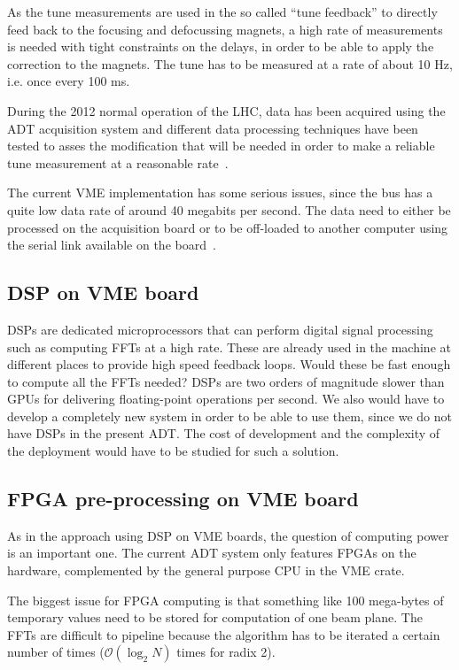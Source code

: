 As the tune measurements are used in the so called ``tune feedback'' to directly feed back to the focusing and defocussing magnets, a high rate of measurements is needed with tight constraints on the delays, in order to be able to apply the correction to the magnets. The \gls{tune} has to be measured at a rate of about 10 Hz, i.e. once every 100 ms.

During the 2012 normal operation of the \gls{LHC}, data has been acquired using the \gls{ADT} acquisition system and different data processing techniques have been tested to asses the modification that will be needed in order to make a reliable \gls{tune} measurement at a reasonable rate~\cite{HofleChamonix12}.

The current \gls{VME} implementation has some serious issues, since the bus has a quite low data rate of around 40 megabits per second. The data need to either be processed on the acquisition board or to be off-loaded to another computer using the serial link available on the board~\cite{Baudrenghien:1124094}.

\subsection{DSP on VME board}

\Glspl{DSP} are dedicated microprocessors that can perform digital signal processing such as computing \glspl{FFT} at a high rate. These are already used in the machine at different places to provide high speed feedback loops. Would these be fast enough to compute all the \glspl{FFT} needed? \glspl{DSP} are two orders of magnitude slower than \glspl{GPU} for delivering floating-point operations per second. We also would have to develop a completely new system in order to be able to use them, since we do not have \glspl{DSP} in the present \gls{ADT}. The cost of development and the complexity of the deployment would have to be studied for such a solution.

\subsection{FPGA pre-processing on VME board}

As in the approach using \gls{DSP} on VME boards, the question of computing power is an important one. The current \gls{ADT} system only features \glspl{FPGA} on the hardware, complemented by the general purpose \gls{CPU} in the \gls{VME} crate.

The biggest issue for \gls{FPGA} computing is that something like 100 mega-bytes of temporary values need to be stored for computation of one beam plane. The \glspl{FFT} are difficult to pipeline because the algorithm has to be iterated a certain number of times ($\mathcal{O}(\log_{2} N)$ times for radix 2).

